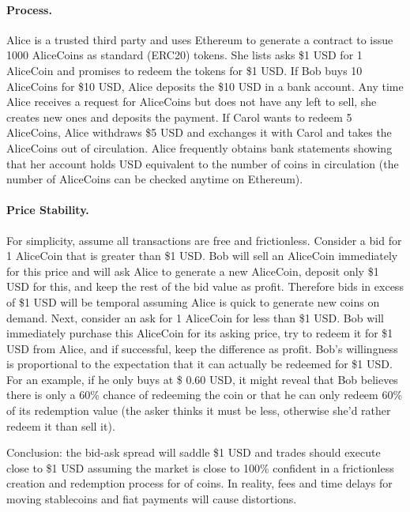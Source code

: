 \paragraph{Process.} Alice is a trusted third party and uses Ethereum to generate a contract to issue 1000 AliceCoins as standard (\eg ERC20) tokens. She lists asks \$1 USD for 1 AliceCoin and promises to redeem the tokens for \$1 USD. If Bob buys 10 AliceCoins for \$10 USD, Alice deposits the \$10 USD in a bank account. Any time Alice receives a request for AliceCoins but does not have any left to sell, she creates new ones and deposits the payment. If Carol wants to redeem 5 AliceCoins, Alice withdraws \$5 USD and exchanges it with Carol and takes the AliceCoins out of circulation. Alice frequently obtains bank statements showing that her account holds USD equivalent to the number of coins in circulation (the number of AliceCoins can be checked anytime on Ethereum).

\paragraph{Price Stability.} For simplicity, assume all transactions are free and frictionless. Consider a bid for 1 AliceCoin that is greater than \$1 USD. Bob will sell an AliceCoin immediately for this price and will ask Alice to generate a new AliceCoin, deposit only \$1 USD for this, and keep the rest of the bid value as profit. Therefore bids in excess of \$1 USD will be temporal assuming Alice is quick to generate new coins on demand. Next, consider an ask for 1 AliceCoin for less than \$1 USD. Bob will immediately purchase this AliceCoin for its asking price, try to redeem it for \$1 USD from Alice, and if successful, keep the difference as profit. Bob's willingness is proportional to the expectation that it can actually be redeemed for \$1 USD. For an example, if he only buys at \$ 0.60 USD, it might reveal that Bob believes there is only a 60\% chance of redeeming the coin or that he can only redeem 60\% of its redemption value (the asker thinks it must be less, otherwise she'd rather redeem it than sell it). 

Conclusion: the bid-ask spread will saddle \$1 USD and trades should execute close to \$1 USD assuming the market is close to 100\% confident in a frictionless creation and redemption process for of coins. In reality, fees and time delays for moving stablecoins and fiat payments will cause distortions.  

